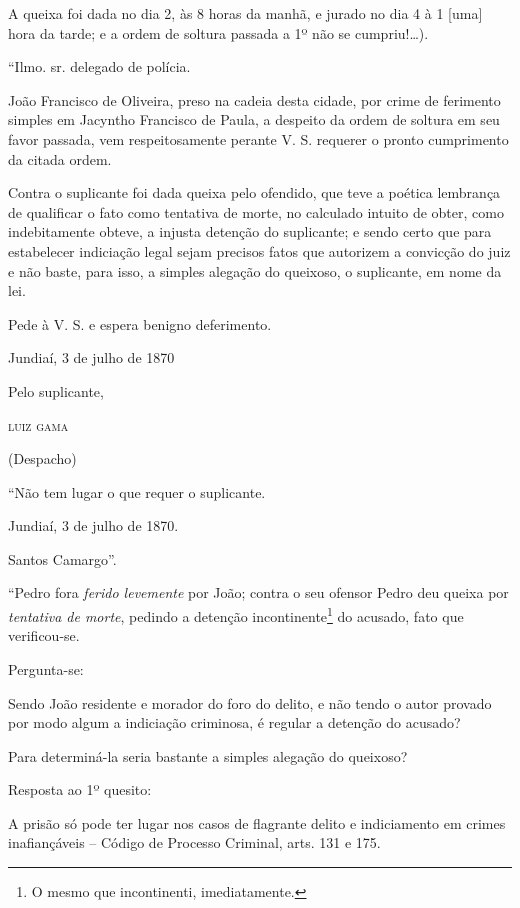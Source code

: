 A queixa foi dada no dia 2, às 8 horas da manhã, e jurado no dia 4 à 1
{[}uma{]} hora da tarde; e a ordem de soltura passada a 1º não se
cumpriu!\ldots{}).

\asterisc{}

``Ilmo. sr. delegado de polícia.

João Francisco de Oliveira, preso na cadeia desta cidade, por crime de
ferimento simples em Jacyntho Francisco de Paula, a despeito da ordem de
soltura em seu favor passada, vem respeitosamente perante V. S. requerer
o pronto cumprimento da citada ordem.

Contra o suplicante foi dada queixa pelo ofendido, que teve a poética
lembrança de qualificar o fato como tentativa de morte, no calculado
intuito de obter, como indebitamente obteve, a injusta detenção do
suplicante; e sendo certo que para estabelecer indiciação legal sejam
precisos fatos que autorizem a convicção do juiz e não baste, para isso,
a simples alegação do queixoso, o suplicante, em nome da lei.

Pede à V. S. e espera benigno deferimento.

\begin{flushright}
Jundiaí, 3 de julho de 1870

Pelo suplicante,

\textsc{luiz gama}
\end{flushright}

(Despacho)

``Não tem lugar o que requer o suplicante.

Jundiaí, 3 de julho de 1870.

Santos Camargo''.

\asterisc{}

``Pedro fora \emph{ferido levemente} por João; contra o seu ofensor Pedro
deu queixa por \emph{tentativa de morte}, pedindo a detenção
incontinente\footnote{ O mesmo que incontinenti, imediatamente.} do
acusado, fato que verificou-se.

Pergunta-se:

Sendo João residente e morador do foro do delito, e não tendo o autor
provado por modo algum a indiciação criminosa, é regular a detenção do
acusado?

Para determiná-la seria bastante a simples alegação do queixoso?

Resposta ao 1º quesito:

A prisão só pode ter lugar nos casos de flagrante delito e indiciamento
em crimes inafiançáveis -- Código de Processo Criminal, arts. 131 e 175.

